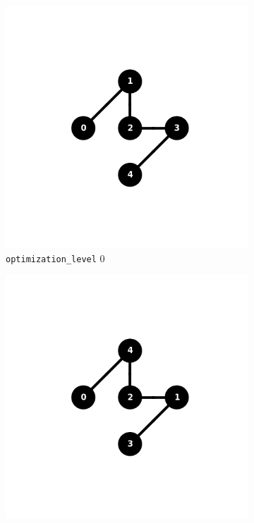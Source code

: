 \documentclass[11pt]{article}
\begin{document}
\begin{figure}[hbtp]
    \begin{subfigure}{0.24\linewidth}
        \centering
        \includegraphics[width=\linewidth]{outputs/routing_FakeAthensV2_0.png}
        \caption{\texttt{optimization\_level} $0$}
    \end{subfigure}
    \begin{subfigure}{0.24\linewidth}
        \centering
        \includegraphics[width=\linewidth]{outputs/routing_FakeAthensV2_1.png}

\end{subfigure}
\end{figure}
\end{document}
